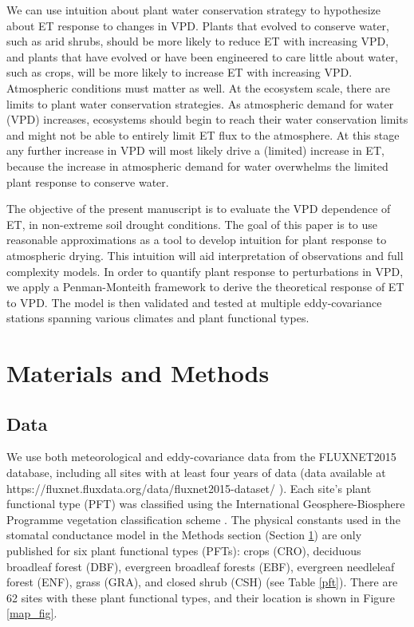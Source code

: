 \documentclass[draft,linenumbers]{agujournal}
\begin{document}
We can use intuition about plant water conservation strategy to
hypothesize about ET response to changes in VPD. Plants that evolved
to conserve water, such as arid shrubs, should be more likely to
reduce ET with increasing VPD, and plants that have evolved or have
been engineered to care little about water, such as crops, will be
more likely to increase ET with increasing VPD. Atmospheric conditions
must matter as well. At the ecosystem scale, there are limits to plant
water conservation strategies. As atmospheric demand for water (VPD)
increases, ecosystems should begin to reach their water conservation
limits and might not be able to entirely limit ET flux to the
atmosphere. At this stage any further increase in VPD will most likely
drive a (limited) increase in ET, because the increase in atmospheric
demand for water overwhelms the limited plant response to conserve
water.

The objective of the present manuscript is to evaluate the VPD
dependence of ET, in non-extreme soil drought conditions. The goal of
this paper is to use reasonable approximations as a tool to develop
intuition for plant response to atmospheric drying. This intuition
will aid interpretation of observations and full complexity models. In
order to quantify plant response to perturbations in VPD, we apply a
Penman-Monteith framework to derive the theoretical response of ET to
VPD. The model is then validated and tested at multiple
eddy-covariance stations spanning various climates and plant
functional types.


\section{Materials and Methods}
\label{methods}
\subsection{Data}
\label{data} We use both meteorological and eddy-covariance data from
the FLUXNET2015 database, including all sites with at least four years
of data (data available at \sloppy
https://fluxnet.fluxdata.org/data/fluxnet2015-dataset/ \sloppy). Each
site's plant functional type (PFT) was classified using the
International Geosphere-Biosphere Programme vegetation classification
scheme \citep{Loveland_1999}. The physical constants used in the
stomatal conductance model in the Methods section (Section
\ref{methods}) are only published for six plant functional types
(PFTs): crops (CRO), deciduous broadleaf forest (DBF), evergreen
broadleaf forests (EBF), evergreen needleleaf forest (ENF), grass
(GRA), and closed shrub (CSH) (see Table \ref{pft}). There are 62
sites with these plant functional types, and their location is shown
in Figure \ref{map_fig}.
\end{document}
